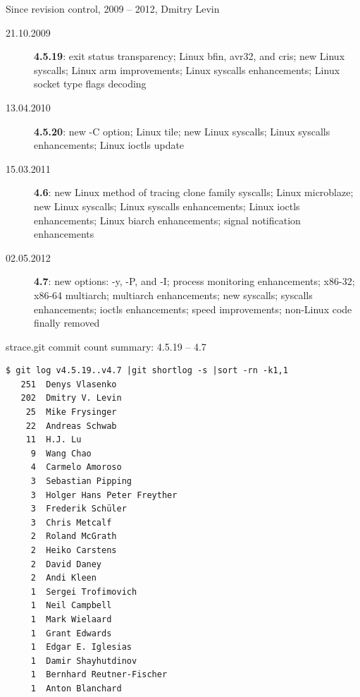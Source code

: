 \documentclass[unicode]{beamer}
\begin{document}
\begin{frame}{Since revision control, 2009 -- 2012, Dmitry Levin}
	\begin{description}
		\item[21.10.2009] {\bf 4.5.19}:
			exit status transparency;
			Linux bfin, avr32, and cris;
			new Linux syscalls;
			Linux arm improvements;
			Linux syscalls enhancements;
			Linux socket type flags decoding
		\item[13.04.2010] {\bf 4.5.20}:
			new -C option;
			Linux tile;
			new Linux syscalls;
			Linux syscalls enhancements;
			Linux ioctls update
		\item[15.03.2011] {\bf 4.6}:
			new Linux method of tracing clone family syscalls;
			Linux microblaze;
			new Linux syscalls;
			Linux syscalls enhancements;
			Linux ioctls enhancements;
			Linux biarch enhancements;
			signal notification enhancements
		\item[02.05.2012] {\bf 4.7}:
			new options: -y, -P, and -I;
			process monitoring enhancements;
			x86-32; x86-64 multiarch;
			multiarch enhancements;
			new syscalls;
			syscalls enhancements;
			ioctls enhancements;
			speed improvements;
			non-Linux code finally removed
	\end{description}
\end{frame}

\begin{frame}[fragile]{strace.git commit count summary: 4.5.19 -- 4.7}
\scriptsize
\begin{verbatim}
$ git log v4.5.19..v4.7 |git shortlog -s |sort -rn -k1,1
   251	Denys Vlasenko
   202	Dmitry V. Levin
    25	Mike Frysinger
    22	Andreas Schwab
    11	H.J. Lu
     9	Wang Chao
     4	Carmelo Amoroso
     3	Sebastian Pipping
     3	Holger Hans Peter Freyther
     3	Frederik Schüler
     3	Chris Metcalf
     2	Roland McGrath
     2	Heiko Carstens
     2	David Daney
     2	Andi Kleen
     1	Sergei Trofimovich
     1	Neil Campbell
     1	Mark Wielaard
     1	Grant Edwards
     1	Edgar E. Iglesias
     1	Damir Shayhutdinov
     1	Bernhard Reutner-Fischer
     1	Anton Blanchard
\end{verbatim}
\end{frame}
\end{document}
